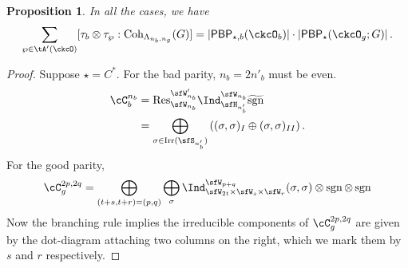 \documentclass[12pt,a4paper]{amsart}
\newcommand{\Res}{\mathrm{Res}}
\def\abs#1{\left|{#1}\right|}
\newcommand{\sgn}{\operatorname{sgn}}
\numberwithin{equation}{section}
\newtheorem{prop}[thm]{Proposition}
\theoremstyle{remark}
\def\Irr{\mathrm{Irr}}
\def\Unip{\mathrm{Unip}}
\def\Cint#1{\Coh_{[#1]}}
\def\LC{{}^{\scriptscriptstyle L}\sC}
\def\Coh{\mathrm{Coh}}
\def\hsgn{\widetilde{\mathrm{sgn}}}
\def\PBP{\mathsf{PBP}}
\def\sP{\wp}
\begin{document}
\begin{prop}
  In all the cases, we have
  \[
    \sum_{\sP\in \tA'(\ckcO)} [\tau_{b}\otimes \tau_{\sP}: \Coh_{\Lambda_{n_{b},n_{g}}}(G)] = \abs{\PBP_{\star,b}(\ckcO_{b})}\cdot
    \abs{\PBP_{\star}(\ckcO_{g}; G)}.
  \]
\end{prop}
\begin{proof}
  Suppose $\star = C^{*}$.
  For the bad parity, $n_{b}=2n'_{b}$ must be even.
  \[
    \begin{split}
      \cC_b^{n_{b}} &=
      \Res_{\sfW_{n_{b}}}^{\sfW'_{n_{b}}} \Ind_{\sfH_{n'_{b}}}^{\sfW_{n_{b}}} \hsgn \\
      &= \bigoplus_{\sigma\in \Irr(\sfS_{n'_{b}})}
      \left((\sigma,\sigma)_{I} \oplus (\sigma,\sigma)_{II}\right).
    \end{split}
  \]
  For the good parity,
  \[
    \begin{split}
          \cC_g^{2p,2q} %
          & =\bigoplus_{\substack{(t+s,t+r)=(p,q)}} \bigoplus_{\sigma} \Ind_{\sfW_{2t}\times \sfW_s\times \sfW_r}^{\sfW_{p+q}}
          (\sigma,\sigma)\otimes \sgn \otimes \sgn \\
    \end{split}
  \]
  Now the branching rule implies the irreducible components of $\cC_{g}^{2p,2q}$
  are given by the dot-diagram attaching two columns on the right, which we mark
  them by $s$ and $r$ respectively.



\end{proof}
\end{document}
